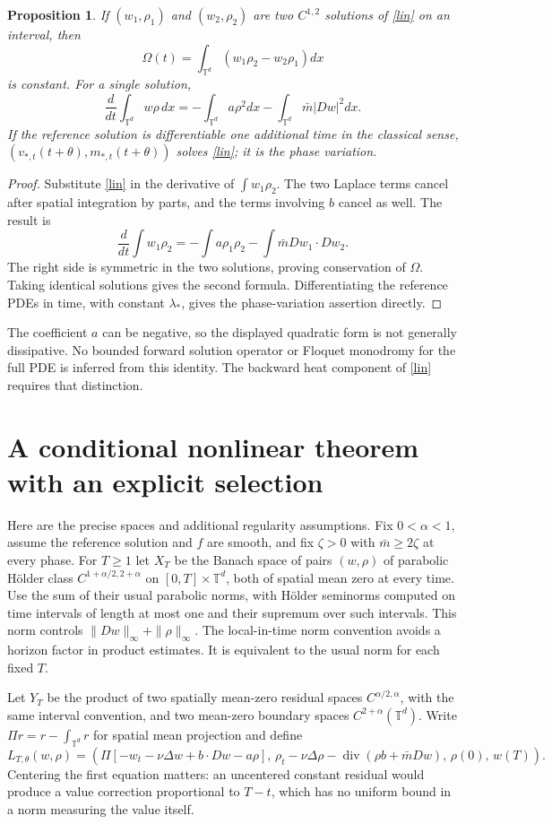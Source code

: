 \documentclass[11pt]{article}
\newtheorem{proposition}[theorem]{Proposition}
\newcommand{\T}{\mathbb T}
\DeclareMathOperator{\diver}{div}
\begin{document}
\begin{proposition}\label{symplectic}
If $(w_1,\rho_1)$ and $(w_2,\rho_2)$ are two $C^{1,2}$ solutions
of \eqref{lin} on an interval, then
\[
 \Omega(t)=\int_{\T^d}(w_1\rho_2-w_2\rho_1)dx
\]
is constant. For a single solution,
\[
 \frac{d}{dt}\int_{\T^d}w\rho\,dx
 =-\int_{\T^d}a\rho^2dx-\int_{\T^d}\bar m|Dw|^2dx.
\]
If the reference solution is differentiable one additional time in the
classical sense, $(v_{*,t}(t+\theta),m_{*,t}(t+\theta))$ solves
\eqref{lin}; it is the phase variation.
\end{proposition}
\begin{proof}
Substitute \eqref{lin} in the derivative of $\int w_1\rho_2$.
The two Laplace terms cancel after spatial integration by parts, and the
terms involving $b$ cancel as well. The result is
\[
 \frac{d}{dt}\int w_1\rho_2
 =-\int a\rho_1\rho_2-\int\bar m Dw_1\cdot Dw_2.
\]
The right side is symmetric in the two solutions, proving conservation
of $\Omega$. Taking identical solutions gives the second formula.
Differentiating the reference PDEs in time, with constant $\lambda_*$,
gives the phase-variation assertion directly.
\end{proof}

The coefficient $a$ can be negative, so the displayed quadratic form is
not generally dissipative. No bounded forward solution operator or
Floquet monodromy for the full PDE is inferred from this identity.
The backward heat component of \eqref{lin} requires that distinction.

\section{A conditional nonlinear theorem with an explicit selection}
Here are the precise spaces and additional regularity assumptions.
Fix $0<\alpha<1$, assume the reference solution and $f$ are smooth,
and fix $\zeta>0$ with $\bar m\geq2\zeta$ at every phase.
For $T\geq1$ let $X_T$ be the Banach space of pairs $(w,\rho)$ of
parabolic H\"older class $C^{1+\alpha/2,2+\alpha}$ on
$[0,T]\times\T^d$, both of spatial mean zero at every time.
Use the sum of their usual parabolic norms, with H\"older seminorms
computed on time intervals of length at most one and their supremum over
such intervals. This norm controls $\|Dw\|_\infty+\|\rho\|_\infty$.
The local-in-time norm convention avoids a horizon factor in product
estimates. It is equivalent to the usual norm for each fixed $T$.

Let $Y_T$ be the product of two spatially mean-zero residual spaces
$C^{\alpha/2,\alpha}$, with the same interval convention, and two
mean-zero boundary spaces $C^{2+\alpha}(\T^d)$.
Write $\Pi r=r-\int_{\T^d}r$ for spatial mean projection and define
\begin{equation}\label{L}
 L_{T,\theta}(w,\rho)=
 \left(\Pi[-w_t-\nu\Delta w+b\cdot Dw-a\rho],\,
 \rho_t-\nu\Delta\rho-\diver(\rho b+\bar m Dw),\,
 \rho(0),\,w(T)\right).
\end{equation}
Centering the first equation matters: an uncentered constant residual
would produce a value correction proportional to $T-t$, which has
no uniform bound in a norm measuring the value itself.
\end{document}
